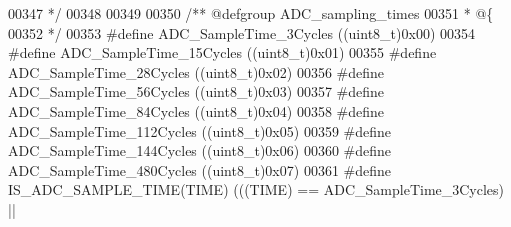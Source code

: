 \begin{DoxyCode}
00347 \textcolor{comment}{  */}
00348 
00349 
00350 \textcolor{comment}{/** @defgroup ADC\_sampling\_times }
00351 \textcolor{comment}{  * @\{}
00352 \textcolor{comment}{  */}
00353 \textcolor{preprocessor}{#}\textcolor{preprocessor}{define} \textcolor{preprocessor}{ADC\_SampleTime\_3Cycles}                    \textcolor{preprocessor}{(}\textcolor{preprocessor}{(}\textcolor{preprocessor}{uint8\_t}\textcolor{preprocessor}{)}0x00\textcolor{preprocessor}{)}
00354 \textcolor{preprocessor}{#}\textcolor{preprocessor}{define} \textcolor{preprocessor}{ADC\_SampleTime\_15Cycles}                   \textcolor{preprocessor}{(}\textcolor{preprocessor}{(}\textcolor{preprocessor}{uint8\_t}\textcolor{preprocessor}{)}0x01\textcolor{preprocessor}{)}
00355 \textcolor{preprocessor}{#}\textcolor{preprocessor}{define} \textcolor{preprocessor}{ADC\_SampleTime\_28Cycles}                   \textcolor{preprocessor}{(}\textcolor{preprocessor}{(}\textcolor{preprocessor}{uint8\_t}\textcolor{preprocessor}{)}0x02\textcolor{preprocessor}{)}
00356 \textcolor{preprocessor}{#}\textcolor{preprocessor}{define} \textcolor{preprocessor}{ADC\_SampleTime\_56Cycles}                   \textcolor{preprocessor}{(}\textcolor{preprocessor}{(}\textcolor{preprocessor}{uint8\_t}\textcolor{preprocessor}{)}0x03\textcolor{preprocessor}{)}
00357 \textcolor{preprocessor}{#}\textcolor{preprocessor}{define} \textcolor{preprocessor}{ADC\_SampleTime\_84Cycles}                   \textcolor{preprocessor}{(}\textcolor{preprocessor}{(}\textcolor{preprocessor}{uint8\_t}\textcolor{preprocessor}{)}0x04\textcolor{preprocessor}{)}
00358 \textcolor{preprocessor}{#}\textcolor{preprocessor}{define} \textcolor{preprocessor}{ADC\_SampleTime\_112Cycles}                  \textcolor{preprocessor}{(}\textcolor{preprocessor}{(}\textcolor{preprocessor}{uint8\_t}\textcolor{preprocessor}{)}0x05\textcolor{preprocessor}{)}
00359 \textcolor{preprocessor}{#}\textcolor{preprocessor}{define} \textcolor{preprocessor}{ADC\_SampleTime\_144Cycles}                  \textcolor{preprocessor}{(}\textcolor{preprocessor}{(}\textcolor{preprocessor}{uint8\_t}\textcolor{preprocessor}{)}0x06\textcolor{preprocessor}{)}
00360 \textcolor{preprocessor}{#}\textcolor{preprocessor}{define} \textcolor{preprocessor}{ADC\_SampleTime\_480Cycles}                  \textcolor{preprocessor}{(}\textcolor{preprocessor}{(}\textcolor{preprocessor}{uint8\_t}\textcolor{preprocessor}{)}0x07\textcolor{preprocessor}{)}
00361 \textcolor{preprocessor}{#}\textcolor{preprocessor}{define} \textcolor{preprocessor}{IS\_ADC\_SAMPLE\_TIME}\textcolor{preprocessor}{(}\textcolor{preprocessor}{TIME}\textcolor{preprocessor}{)} \textcolor{preprocessor}{(}\textcolor{preprocessor}{(}\textcolor{preprocessor}{(}\textcolor{preprocessor}{TIME}\textcolor{preprocessor}{)} \textcolor{preprocessor}{==} ADC_SampleTime_3Cycles\textcolor{preprocessor}{)} \textcolor{preprocessor}{||}

\end{DoxyCode}
